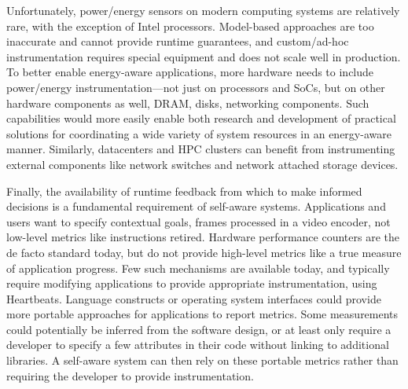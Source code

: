 Unfortunately, power/energy sensors on modern computing systems are relatively rare, with the exception of Intel processors.
Model-based approaches are too inaccurate and cannot provide runtime guarantees, and custom/ad-hoc instrumentation requires special equipment and does not scale well in production.
To better enable energy-aware applications, more hardware needs to include power/energy instrumentation---not just on processors and SoCs, but on other hardware components as well, \eg DRAM, disks, networking components.
Such capabilities would more easily enable both research and development of practical solutions for coordinating a wide variety of system resources in an energy-aware manner.
Similarly, datacenters and HPC clusters can benefit from instrumenting external components like network switches and network attached storage devices.

Finally, the availability of runtime feedback from which to make informed decisions is a fundamental requirement of self-aware systems.
Applications and users want to specify contextual goals, \eg frames processed in a video encoder, not low-level metrics like instructions retired.
Hardware performance counters are the de facto standard today, but do not provide high-level metrics like a true measure of application progress.
Few such mechanisms are available today, and typically require modifying applications to provide appropriate instrumentation, \eg using Heartbeats.
Language constructs or operating system interfaces could provide more portable approaches for applications to report metrics.
Some measurements could potentially be inferred from the software design, or at least only require a developer to specify a few attributes in their code without linking to additional libraries.
A self-aware system can then rely on these portable metrics rather than requiring the developer to provide instrumentation.
